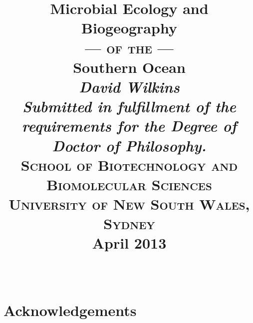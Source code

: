 \documentclass[a4paper]{book}
\begin{document}
\date{}
\title{
  \bigskip
  \Huge{Microbial Ecology and Biogeography}\\ \medskip \vspace{1 mm} \smallskip \smallskip \Large{\textsc{--- of the ---}}\\ \medskip \Huge{Southern Ocean}\\
  \bigskip
  \bigskip
  \bigskip
  \bigskip
  \bigskip
  \bigskip
  \bigskip
  \bigskip
  \huge{\textit{David Wilkins}}
  \vfill
  \small{
    \large{\adfdoubleflourishright}\\
    \smallskip
    \textit{Submitted in fulfillment of the requirements for the Degree of Doctor of Philosophy.}\\
    \medskip
    \textsc{School of Biotechnology and Biomolecular Sciences\\
    University of New South Wales, Sydney}\\
    \medskip
    \large{\textbf{April 2013}}\\
    \smallskip
    \large{\adfdoubleflourishright}\\
  }
  \medskip
}

\maketitle






\tableofcontents

\listoffigures
{}

\listoftables
{}

\singlespacing
\printglossary[type=\acronymtype]

\chapter*{Acknowledgements}

\clearpage
{}

\glsresetall


\glsresetall


\glsresetall


\glsresetall


\glsresetall


\singlespacing
{}


\end{document}
